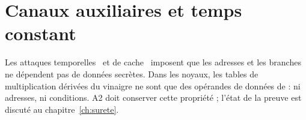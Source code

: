 \section{Canaux auxiliaires et temps constant}
Les attaques temporelles~\cite{kocher} et de cache~\cite{bernstein} imposent que les adresses et les branches ne dépendent pas de données secrètes. Dans les noyaux, les tables de multiplication dérivées du vinaigre ne sont que des opérandes de données de \vpshufb{} : ni adresses, ni conditions. A2 doit conserver cette propriété ; l'état de la preuve est discuté au chapitre~\ref{ch:surete}.
